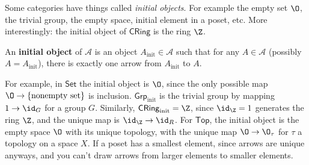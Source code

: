 \orbreak
Some categories have things called \emph{initial objects}. For example the empty set $\O$, the trivial group, the empty space, initial element in a poset, etc. More interestingly: the initial object of $\mathsf{CRing} $ is the ring $\Z$.
\begin{definition}
    An \textbf{initial object} of $\mathcal{A} $ is an object $A_{\text{init}}\in \mathcal{A} $ such that for any $A\in \mathcal{A} $ (possibly $A=A_{\text{init}}$), there is exactly one arrow from $A_{\text{init}}$ to $A$.
\end{definition}
For example, in $\mathsf{Set} $ the initial object is $\O$, since the only possible map $\O \to \{ \text{nonempty set} \} $ is inclusion. $\mathsf{Grp} _{\text{init}  }$ is the trivial group by mapping $1 \to \id_G$ for a group $G$. Similarly, $\mathsf{CRing} _{\text{init}  }=\Z$, since $\id_{\Z}=1$ generates the ring $\Z$, and the unique map is $\id_{\Z}\to  \id_R$. For $\mathsf{Top} $, the initial object is the empty space $\O$ with its unique topology, with the unique map $\O \to  \O_{\tau} $ for $\tau$ a topology on a space $X$. If a poset has a smallest element, since arrows are unique anyways, and you can't draw arrows from larger elements to smaller elements.

